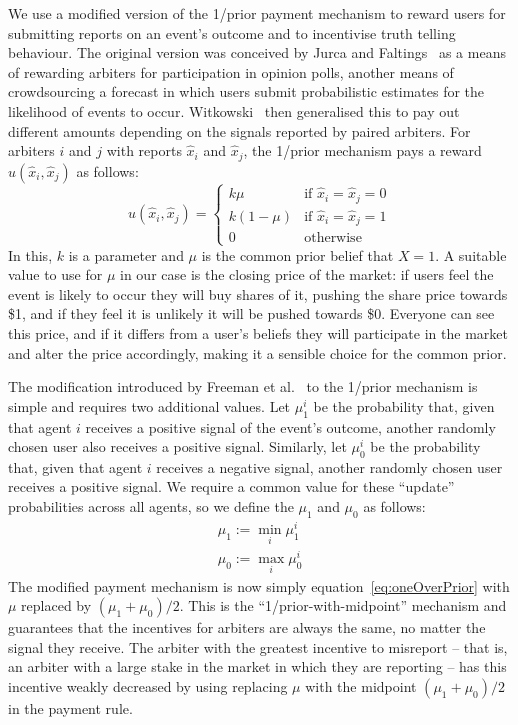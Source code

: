 We use a modified version of the 1/prior payment mechanism to reward users for
submitting reports on an event's outcome and to incentivise truth telling
behaviour. The original version was conceived by Jurca and
Faltings~\cite{JurcaFaltings2008, JurcaFaltings2011} as a means of rewarding
arbiters for participation in opinion polls, another means of crowdsourcing a
forecast in which users submit probabilistic estimates for the likelihood of
events to occur. Witkowski~\cite{Witkowski2014} then generalised this to pay
out different amounts depending on the signals reported by paired arbiters. For
arbiters $i$ and $j$ with reports $\hat{x}_i$ and $\hat{x}_j$, the 1/prior
mechanism pays a reward $u(\hat{x}_i, \hat{x}_j)$ as follows:
%
\begin{equation}
	\label{eq:oneOverPrior}
	u(\hat{x}_i, \hat{x}_j) =
	\begin{cases}
		k \mu & \text{if } \hat{x}_i = \hat{x}_j = 0 \\
		k (1-\mu) & \text{if } \hat{x}_i = \hat{x}_j = 1 \\
		0 & \text{otherwise}
	\end{cases}
\end{equation}
%
In this, $k$ is a parameter and $\mu$ is the common prior belief that $X=1$. A
suitable value to use for $\mu$ in our case is the closing price of the market:
if users feel the event is likely to occur they will buy shares of it, pushing
the share price towards \$1, and if they feel it is unlikely it will be pushed
towards \$0. Everyone can see this price, and if it differs from a user's
beliefs they will participate in the market and alter the price accordingly,
making it a sensible choice for the common prior.

The modification introduced by Freeman et al.~\cite{Freeman2017} to the 1/prior
mechanism is simple and requires two additional values. Let $\mu_1^i$ be the
probability that, given that agent $i$ receives a positive signal of the
event's outcome, another randomly chosen user also receives a positive signal.
Similarly, let $\mu_0^i$ be the probability that, given that agent $i$ receives
a negative signal, another randomly chosen user receives a positive signal. We
require a common value for these ``update'' probabilities across all agents, so
we define the $\mu_1$ and $\mu_0$ as follows:
%
\begin{equation}
	\begin{gathered}
		\mu_1 := \min_i \mu_1^i \\
		\mu_0 := \max_i \mu_0^i
	\end{gathered}
\end{equation}
%
The modified payment mechanism is now simply equation~\eqref{eq:oneOverPrior}
with $\mu$ replaced by $(\mu_1 + \mu_0)/2$. This is the
``1/prior-with-midpoint'' mechanism and guarantees that the incentives for
arbiters are always the same, no matter the signal they receive. The arbiter
with the greatest incentive to misreport -- that is, an arbiter with a large
stake in the market in which they are reporting -- has this incentive weakly
decreased by using replacing $\mu$ with the midpoint $(\mu_1 + \mu_0)/2$ in the
payment rule.

